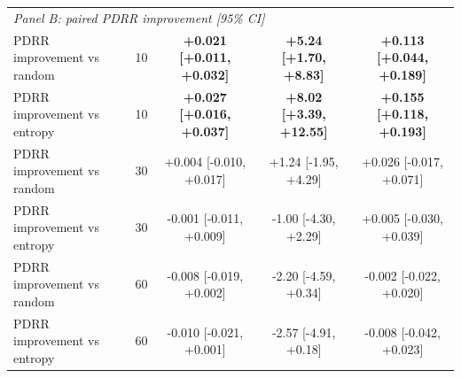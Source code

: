 \begin{table}[t]
\begin{tabular}{llccc}
\midrule
\multicolumn{5}{l}{\textit{Panel B: paired PDRR improvement [95\% CI]}} \\
PDRR improvement vs random & 10 & \textbf{+0.021 [+0.011, +0.032]} & \textbf{+5.24 [+1.70, +8.83]} & \textbf{+0.113 [+0.044, +0.189]} \\
PDRR improvement vs entropy & 10 & \textbf{+0.027 [+0.016, +0.037]} & \textbf{+8.02 [+3.39, +12.55]} & \textbf{+0.155 [+0.118, +0.193]} \\
\addlinespace[2pt]
PDRR improvement vs random & 30 & +0.004 [-0.010, +0.017] & +1.24 [-1.95, +4.29] & +0.026 [-0.017, +0.071] \\
PDRR improvement vs entropy & 30 & -0.001 [-0.011, +0.009] & -1.00 [-4.30, +2.29] & +0.005 [-0.030, +0.039] \\
\addlinespace[2pt]
PDRR improvement vs random & 60 & -0.008 [-0.019, +0.002] & -2.20 [-4.59, +0.34] & -0.002 [-0.022, +0.020] \\
PDRR improvement vs entropy & 60 & -0.010 [-0.021, +0.001] & -2.57 [-4.91, +0.18] & -0.008 [-0.042, +0.023] \\
\bottomrule
\end{tabular}
\end{table}
